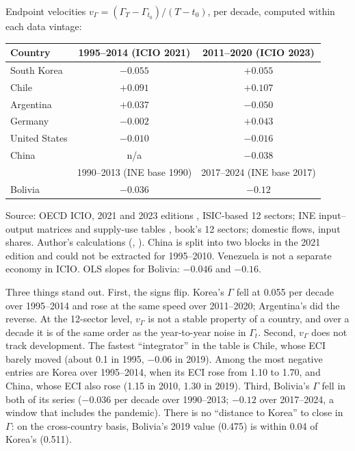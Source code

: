 \documentclass[../structural_economics_book.tex]{subfiles}
\begin{document}
\begin{example}\label{ch23:ex:velocities}
Endpoint velocities $v_\Gamma = (\Gamma_T - \Gamma_{t_0})/(T - t_0)$, per decade, computed within each data vintage:
\begin{center}
\begin{tabular}{lcc}
\toprule
Country & 1995--2014 (ICIO 2021) & 2011--2020 (ICIO 2023) \\
\midrule
South Korea & $-0.055$ & $+0.055$ \\
Chile & $+0.091$ & $+0.107$ \\
Argentina & $+0.037$ & $-0.050$ \\
Germany & $-0.002$ & $+0.043$ \\
United States & $-0.010$ & $-0.016$ \\
China & n/a & $-0.038$ \\
\midrule
 & 1990--2013 (INE base 1990) & 2017--2024 (INE base 2017) \\
Bolivia & $-0.036$ & $-0.12$ \\
\bottomrule
\end{tabular}
\end{center}
\par{\footnotesize Source: OECD ICIO, 2021 and 2023 editions \citep{oecd2021icio,oecd2023icio}, ISIC-based 12 sectors; INE input--output matrices and supply-use tables \citep{ine2026sut}, book's 12 sectors; domestic flows, input shares. Author's calculations (, ). China is split into two blocks in the 2021 edition and could not be extracted for 1995--2010. Venezuela is not a separate economy in ICIO. OLS slopes for Bolivia: $-0.046$ and $-0.16$.\par}

Three things stand out. First, the signs flip. Korea's $\Gamma$ fell at 0.055 per decade over 1995--2014 and rose at the same speed over 2011--2020; Argentina's did the reverse. At the 12-sector level, $v_\Gamma$ is not a stable property of a country, and over a decade it is of the same order as the year-to-year noise in $\Gamma_t$. Second, $v_\Gamma$ does not track development. The fastest ``integrator'' in the table is Chile, whose ECI barely moved (about 0.1 in 1995, $-0.06$ in 2019). Among the most negative entries are Korea over 1995--2014, when its ECI rose from 1.10 to 1.70, and China, whose ECI also rose (1.15 in 2010, 1.30 in 2019). Third, Bolivia's $\Gamma$ fell in both of its series ($-0.036$ per decade over 1990--2013; $-0.12$ over 2017--2024, a window that includes the pandemic). There is no ``distance to Korea'' to close in $\Gamma$: on the cross-country basis, Bolivia's 2019 value (0.475) is within 0.04 of Korea's (0.511).
\end{example}
\end{document}
